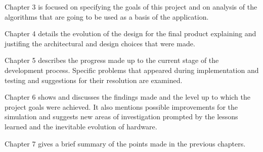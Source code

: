\documentclass[main.tex]{subfiles}
\begin{document}
Chapter 3 is focused on specifying the goals of this project and on analysis of the algorithms that are going to be used as a basis of the application.

Chapter 4 details the evolution of the design for the final product explaining and justifing the architectural and design choices that were made.

Chapter 5 describes the progress made up to the current stage of the development process. Specific problems that appeared during implementation and testing and suggestions for their resolution are examined.

Chapter 6 shows and discusses the findings made and the level up to which the project goals were achieved. It also mentions possible improvements for the simulation and suggests new areas of investigation prompted by the lessons learned and the inevitable evolution of hardware.

Chapter 7 gives a brief summary of the points made in the previous chapters.

\end{document}
